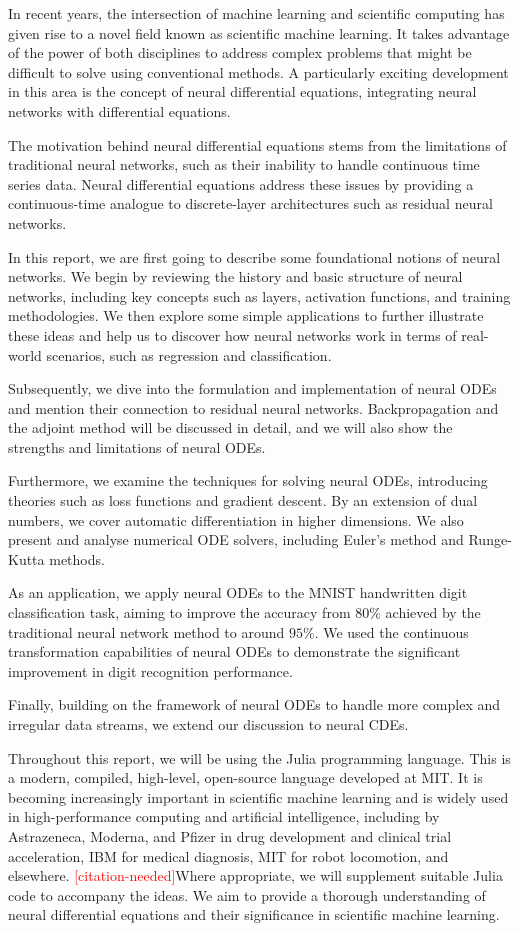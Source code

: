 \documentclass[a4paper,11pt,titlepage]{article}
\newcommand{\citationneeded}{\textcolor{red}{[citation-needed]}}
\theoremstyle{definition}
\theoremstyle{plain}
\theoremstyle{remark}
\begin{document}
In recent years, the intersection of machine learning and scientific computing has given rise to a novel field known as scientific machine learning. It takes advantage of the power of both disciplines to address complex problems that might be difficult to solve using conventional methods. A particularly exciting development in this area is the concept of neural differential equations, integrating neural networks with differential equations.

The motivation behind neural differential equations stems from the limitations of traditional neural networks, such as their inability to handle continuous time series data. Neural differential equations address these issues by providing a continuous-time analogue to discrete-layer architectures such as residual neural networks.

In this report, we are first going to describe some foundational notions of neural networks. We begin by reviewing the history and basic structure of neural networks, including key concepts such as layers, activation functions, and training methodologies. We then explore some simple applications to further illustrate these ideas and help us to discover how neural networks work in terms of real-world scenarios, such as regression and classification.

Subsequently, we dive into the formulation and implementation of neural ODEs and mention their connection to residual neural networks. Backpropagation and the adjoint method will be discussed in detail, and we will also show the strengths and limitations of neural ODEs.

Furthermore, we examine the techniques for solving neural ODEs, introducing theories such as loss functions and gradient descent. By an extension of dual numbers, we cover automatic differentiation in higher dimensions. We also present and analyse numerical ODE solvers, including Euler's method and Runge-Kutta methods.

As an application, we apply neural ODEs to the MNIST handwritten digit classification task, aiming to improve the accuracy from $80\%$ achieved by the traditional neural network method to around $95\%$. We used the continuous transformation capabilities of neural ODEs to demonstrate the significant improvement in digit recognition performance.

Finally, building on the framework of neural ODEs to handle more complex and irregular data streams, we extend our discussion to neural CDEs.

Throughout this report, we will be using the Julia programming language. This is a modern, compiled, high-level, open-source language developed at MIT. It is becoming increasingly important in scientific machine learning and is widely used in high-performance computing and artificial intelligence, including by Astrazeneca, Moderna, and Pfizer in drug development and clinical trial acceleration, IBM for medical diagnosis, MIT for robot locomotion, and elsewhere. \citationneeded Where appropriate, we will supplement suitable Julia code to accompany the ideas. We aim to provide a thorough understanding of neural differential equations and their significance in scientific machine learning.
\end{document}
